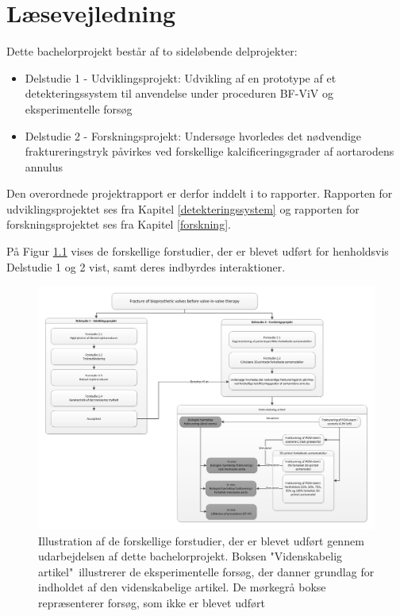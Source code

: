 \chapter{Læsevejledning}
Dette bachelorprojekt består af to sideløbende delprojekter: 

\begin{itemize}
	\item Delstudie 1 - Udviklingsprojekt: Udvikling af en prototype af et detekteringssystem til anvendelse under proceduren BF-ViV og eksperimentelle forsøg 
	\item Delstudie 2 - Forskningsprojekt: Undersøge hvorledes det nødvendige fraktureringstryk påvirkes ved forskellige kalcificeringsgrader af aortarodens annulus  
\end{itemize}

Den overordnede projektrapport er derfor inddelt i to rapporter. Rapporten for udviklingsprojektet ses fra Kapitel \ref{detekteringssystem} og rapporten for forskningsprojektet ses fra Kapitel \ref{forskning}.  


På Figur \ref{flow1} vises de forskellige forstudier, der er blevet udført for henholdsvis Delstudie 1 og 2 vist, samt deres indbyrdes interaktioner. 

\begin{figure}[H]
	\centering
	\includegraphics[width=1\textwidth]{Figure/flowchart}
	\caption{Illustration af de forskellige forstudier, der er blevet udført gennem udarbejdelsen af dette bachelorprojekt. Boksen "Videnskabelig artikel"\ illustrerer de eksperimentelle forsøg, der danner grundlag for indholdet af den videnskabelige artikel. De mørkegrå bokse repræsenterer forsøg, som ikke er blevet udført}
    \label{flow1}
\end{figure}

